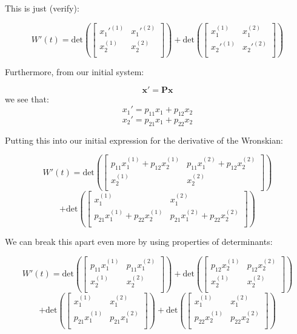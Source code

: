\documentclass{report}
\begin{document}
{This is just (verify):

$$
W'(t) =
\text{det}\left(
\begin{bmatrix}
    x_1'^{(1)} & x_1'^{(2)} \\
    x_2^{(1)} & x_2^{(2)} \\
\end{bmatrix}\right)
+
\text{det}\left(
\begin{bmatrix}
    x_1^{(1)} & x_1^{(2)} \\
    x_2'^{(1)} & x_2'^{(2)} \\
\end{bmatrix}\right)
$$

Furthermore, from our initial system:

$$\mathbf{x'} = \mathbf{Px}$$
we see that:
$$x_1' = p_{11}x_1 + p_{12}x_2$$
$$x_2' = p_{21}x_1 + p_{22}x_2$$

Putting this into our initial expression for the derivative of the Wronskian:

$$
W'(t) =
\text{det}\left(
\begin{bmatrix}
    p_{11}x_1^{(1)} + p_{12}x_2^{(1)} & p_{11}x_1^{(2)} + p_{12}x_2^{(2)} \\
    x_2^{(1)} & x_2^{(2)} \\
\end{bmatrix}\right)
$$
$$
+
\text{det}\left(
\begin{bmatrix}
    x_1^{(1)} & x_1^{(2)} \\
    p_{21}x_1^{(1)} + p_{22}x_2^{(1)} & p_{21}x_1^{(2)} + p_{22}x_2^{(2)} \\
\end{bmatrix}\right)
$$

We can break this apart even more by using properties of determinants:

$$
W'(t) =
\text{det}\left(
\begin{bmatrix}
    p_{11}x_1^{(1)} & p_{11}x_1^{(2)} \\
    x_2^{(1)} & x_2^{(2)} \\
\end{bmatrix}\right)
+
\text{det}\left(
\begin{bmatrix}
     p_{12}x_2^{(1)} &  p_{12}x_2^{(2)} \\
    x_2^{(1)} & x_2^{(2)} \\
\end{bmatrix}\right)
$$
$$
+
\text{det}\left(
\begin{bmatrix}
    x_1^{(1)} & x_1^{(2)} \\
    p_{21}x_1^{(1)} & p_{21}x_1^{(2)} \\
\end{bmatrix}\right)
+
\text{det}\left(
\begin{bmatrix}
    x_1^{(1)} & x_1^{(2)} \\
    p_{22}x_2^{(1)} &  p_{22}x_2^{(2)} \\
\end{bmatrix}\right)
$$

}
\end{document}

